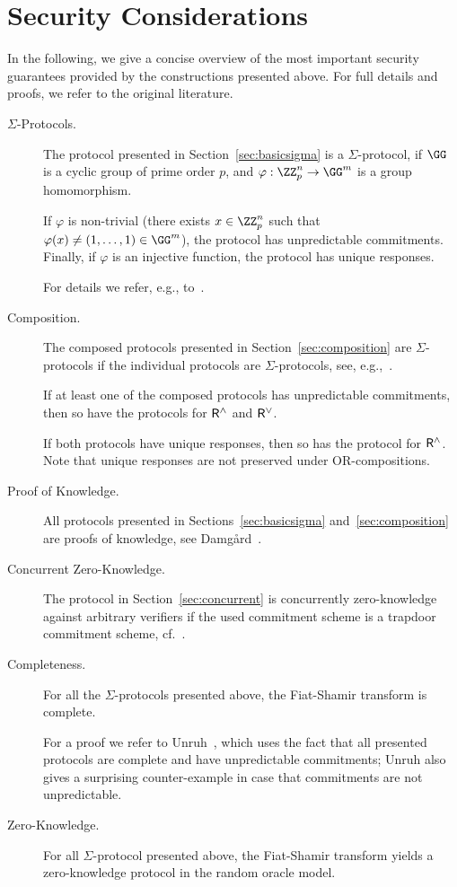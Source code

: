 \documentclass[runningheads]{llncs}
\begin{document}
\section{Security Considerations}

In the following, we give a concise overview of the most important security guarantees provided by the constructions presented above.
For full details and proofs, we refer to the original literature.

\begin{description}
  \item[$\Sigma$-Protocols.]
  The protocol presented in Section~\ref{sec:basicsigma} is a $\Sigma$-protocol, if $\GG$ is a cyclic group of prime order $p$, and $\varphi:\ZZ_p^n\to\GG^m$ is a group homomorphism.

  If $\varphi$ is non-trivial (there exists $x\in\ZZ_p^n$ such that $\varphi(x)\ne (1,\dots,1)\in\GG^m$), the protocol has unpredictable commitments.
  Finally, if $\varphi$ is an injective function, the protocol has unique responses. 
  
  For details we refer, e.g., to~\cite{cramer97}.

  \item[Composition.]
    The composed protocols presented in Section~\ref{sec:composition} are $\Sigma$-protocols if the individual protocols are $\Sigma$-protocols, see, e.g.,~\cite{C:CraDamSch94}.

  If at least one of the composed protocols has unpredictable commitments, then so have the protocols for $\mathsf{R}^\land$ and $\mathsf{R}^\lor$.

  If both protocols have unique responses, then so has the protocol for $\mathsf{R}^\land$.
  Note that unique responses are not preserved under OR-compositions.
  
  \item[Proof of Knowledge.]
    All protocols presented in Sections~\ref{sec:basicsigma} and~\ref{sec:composition} are proofs of knowledge, see Damg\r{a}rd~\cite{damgard04}.
  \item[Concurrent Zero-Knowledge.]
    The protocol in Section~\ref{sec:concurrent} is concurrently zero-knowledge against arbitrary verifiers if the used commitment scheme is a trapdoor commitment scheme, cf.~\cite{EC:Damgard00}.
%
  \item[Completeness.]
    For all the $\Sigma$-protocols presented above, the Fiat-Shamir transform is complete.


    For a proof we refer to Unruh~\cite{AC:Unruh17}, which uses the fact that all presented protocols are complete and have unpredictable commitments;
    Unruh also gives a surprising counter-example in case that commitments are not unpredictable.
  \item[Zero-Knowledge.]
    For all $\Sigma$-protocol presented above, the Fiat-Shamir transform yields a zero-knowledge protocol in the random oracle model.


\end{description}
\end{document}
